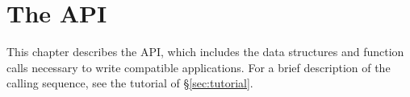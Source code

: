 \chapter{The API}
\label{chap:api}

This chapter describes the {\libraryshort} API, which includes the data structures and function calls necessary to write compatible applications.  For a brief description of the calling sequence, see the tutorial of \S\ref{sec:tutorial}.  